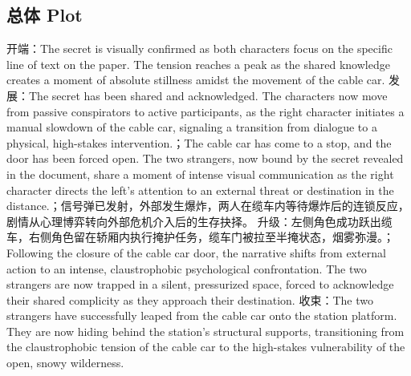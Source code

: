 \documentclass[11pt,a4paper]{article}
\begin{document}
\subsection*{总体 Plot}
开端：The secret is visually confirmed as both characters focus on the specific line of text on the paper. The tension reaches a peak as the shared knowledge creates a moment of absolute stillness amidst the movement of the cable car. 发展：The secret has been shared and acknowledged. The characters now move from passive conspirators to active participants, as the right character initiates a manual slowdown of the cable car, signaling a transition from dialogue to a physical, high-stakes intervention.；The cable car has come to a stop, and the door has been forced open. The two strangers, now bound by the secret revealed in the document, share a moment of intense visual communication as the right character directs the left's attention to an external threat or destination in the distance.；信号弹已发射，外部发生爆炸，两人在缆车内等待爆炸后的连锁反应，剧情从心理博弈转向外部危机介入后的生存抉择。 升级：左侧角色成功跃出缆车，右侧角色留在轿厢内执行掩护任务，缆车门被拉至半掩状态，烟雾弥漫。；Following the closure of the cable car door, the narrative shifts from external action to an intense, claustrophobic psychological confrontation. The two strangers are now trapped in a silent, pressurized space, forced to acknowledge their shared complicity as they approach their destination. 收束：The two strangers have successfully leaped from the cable car onto the station platform. They are now hiding behind the station's structural supports, transitioning from the claustrophobic tension of the cable car to the high-stakes vulnerability of the open, snowy wilderness.
\end{document}
